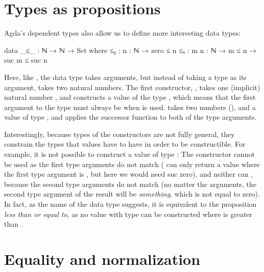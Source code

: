 %

	\section{Types as propositions}

		Agda's dependent types also allow us to define more interesting data
		types:

		\begin{code}
			data _≤_ : ℕ → ℕ → Set where
			  ≤₀  : {n : ℕ} → zero ≤ n
			  ≤ₛ  : {m n : ℕ} → m ≤ n → suc m ≤ suc n
		\end{code}

		Here, like \codett{\_*}, the data type  takes arguments,
		but instead of taking a type as its argument,  takes two
		natural numbers. The first constructor, , takes one
		(implicit) natural number , and constructs a value of the
		type , which means that the first argument to the type
		must always be  when  is used. 
		takes two numbers (), and a value of type ,
		and applies the successor function to both of the type arguments.

		Interestingly, because types of the constructors are not fully general,
		they constrain the types that values have to have in order to be
		constructible. For example, it is not possible to construct a value of
		type : The constructor  cannot be
		used as the first type arguments do not match ( can only
		return a value where the first type argument is , but here
		we would need suc zero), and neither can , because the
		second type arguments do not match (no matter the arguments, the second
		type argument of the result will be  \emph{something},
		which is not equal to zero). In fact, as the name of the data type
		suggests, it is equivalent to the proposition \emph{less than or equal
		to}, as no value with type  can be constructed where
		 is greater than .

	\section{Equality and normalization}


